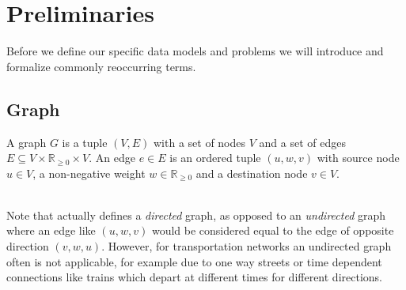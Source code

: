 \section{Preliminaries}\label{preliminaries}
	Before we define our specific data models and problems we will introduce and formalize commonly reoccurring terms.

\subsection{Graph}
	\begin{mydef}\label{graph}
		A \textnormal{graph} $G$ is a tuple $(V, E)$ with a set of nodes $V$ and a set of
		edges $E \subseteq V \times \mathbb{R}_{\ge 0} \times V$.
		An \textnormal{edge} $e \in E$ is an ordered tuple $(u, w, v)$ with source node $u \in V$, a non-negative
		weight $w \in \mathbb{R}_{\ge 0}$ and a destination node $v \in V$.
	\end{mydef}\quad\\
	Note that  actually defines a \textit{directed} graph, as opposed to an \textit{undirected} graph where an
	edge like $(u, w, v)$ would be considered equal to the edge of opposite direction $(v, w, u)$. However, for transportation networks
	an undirected graph often is not applicable, for example due to one way streets or time dependent connections like trains which depart
	at different times for different directions.
	
